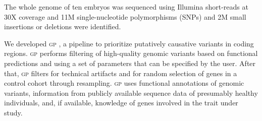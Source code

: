 \documentclass[fleqn,12pt]{wlscirep}
\newcommand{\gp}[]{\textsc{gp }}
\begin{document}
The whole genome of ten embryos was sequenced using Illumina short-reads at 30X coverage and 11M single-nucleotide polymorphisms (SNPs) and 2M small insertions or deletions were identified.%


We developed \gp,\cite{gp2020} a pipeline to prioritize putatively causative variants in coding regions. \gp performs filtering of high-quality genomic variants based on functional predictions and using a set of parameters that can be specified by the user. After that, \gp filters for technical artifacts and for random selection of genes in a control cohort through resampling. 
\gp uses functional annotations of genomic variants, information from publicly available sequence data of presumably healthy individuals, and, if available, knowledge of genes involved in the trait under study. %
\end{document}
